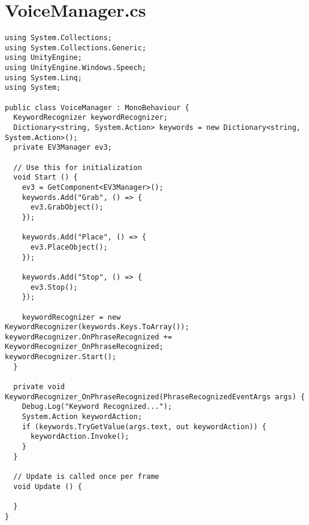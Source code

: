 \section{VoiceManager.cs}
\begin{lstlisting}[caption=VoiceManager.cs, label=code:VoiceManager]
using System.Collections;
using System.Collections.Generic;
using UnityEngine;
using UnityEngine.Windows.Speech;
using System.Linq;
using System;

public class VoiceManager : MonoBehaviour {
  KeywordRecognizer keywordRecognizer;
  Dictionary<string, System.Action> keywords = new Dictionary<string, System.Action>();
  private EV3Manager ev3;
  
  // Use this for initialization
  void Start () {         
	ev3 = GetComponent<EV3Manager>();         
	keywords.Add("Grab", () => {             
	  ev3.GrabObject();         
	});         
	
	keywords.Add("Place", () => {             
	  ev3.PlaceObject();         
	});         
	
	keywords.Add("Stop", () => {             
	  ev3.Stop();         
	});
	
	keywordRecognizer = new KeywordRecognizer(keywords.Keys.ToArray());         keywordRecognizer.OnPhraseRecognized += KeywordRecognizer_OnPhraseRecognized;         keywordRecognizer.Start();
  }     
  
  private void KeywordRecognizer_OnPhraseRecognized(PhraseRecognizedEventArgs args) {
	Debug.Log("Keyword Recognized..."); 
	System.Action keywordAction; 
	if (keywords.TryGetValue(args.text, out keywordAction)) { 
	  keywordAction.Invoke(); 
	}
  }
  
  // Update is called once per frame
  void Update () {
  
  } 
}
\end{lstlisting}
